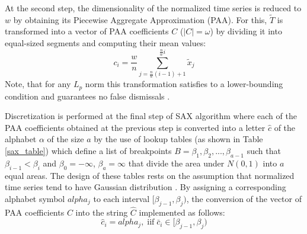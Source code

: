 At the second step, the dimensionality of the normalized time series is reduced to $w$ by obtaining its 
Piecewise Aggregate Approximation (PAA). For this, $\widetilde{T}$ is transformed into a vector of PAA coefficients $C$ ($|C|=\omega$) 
by dividing it into equal-sized segments and computing their mean values:
\begin{equation}
c_{i} = \frac{w}{n} \sum_{j=\frac{n}{w}(i-1)+1}^{\frac{n}{w}i} \widetilde{x}_{j}
\label{eq:paa}
\end{equation}
Note, that for any $L_{p}$ norm this transformation satisfies to a lower-bounding condition and guarantees no false dismissals
\cite{citeulike:2946589} \cite{citeulike:3000416}.

Discretization is performed at the final step of SAX algorithm where each of the PAA coefficients obtained at the previous step 
is converted into a letter $\widehat{c}$ of the alphabet $\alpha$ of the size $a$ by the use of lookup tables (as shown in Table \ref{sax_table}) 
which define a list of breakpoints 
$B=\beta_{1}, \beta_{2}, ... , \beta_{a-1}$ such that $\beta_{i-1} < \beta_{i}$ and $\beta_{0} = -\infty$, $\beta_{a} = \infty$ 
that divide the area under $N(0,1)$ into $a$ equal areas. 
The design of these tables rests on the assumption that normalized time series tend to have Gaussian distribution \cite{citeulike:10141990} \cite{sax}.
By assigning a corresponding alphabet symbol $alpha_{j}$ to each interval $[\beta_{j-1},\beta_{j})$, the conversion of the vector of PAA coefficients 
$C$ into the string $\widehat{C}$ implemented as follows: 
\begin{equation}
\widehat{c}_{i} = alpha_{j}, \; \text{iif} \; \bar{c}_{i} \in [\beta_{j-1},\beta_{j})
\label{eq:sax_alphabet}
\end{equation}

